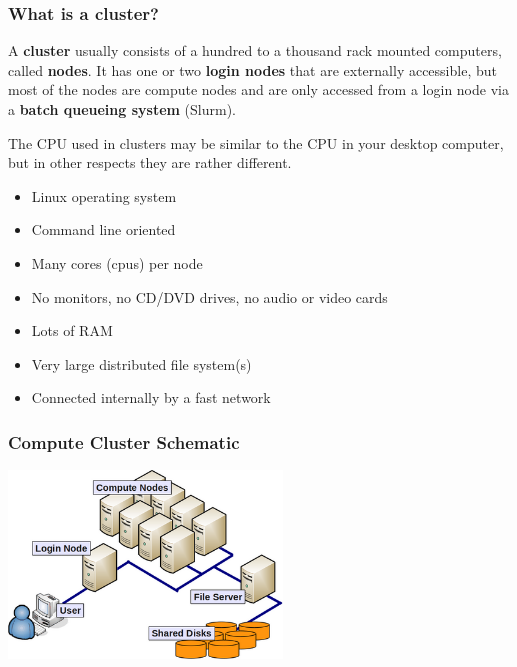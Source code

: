 \documentclass[10pt]{beamer}
\begin{document}
\begin{frame}
\frametitle{What is a cluster?}

A \textbf{cluster} usually consists of a hundred to a thousand rack mounted
computers, called \textbf{nodes}.  It has one or two \textbf{login nodes}
that are externally accessible, but most of the nodes are
compute nodes and are only accessed from a login node via a
\textbf{batch queueing system} (Slurm).

\vskip10pt
The CPU used in clusters may be similar to the CPU in your
desktop computer, but in other respects they are rather different.

\begin{itemize}
\item Linux operating system
\item Command line oriented 
\item Many cores (cpus) per node
\item No monitors, no CD/DVD drives, no audio or video cards
\item Lots of RAM
\item Very large distributed file system(s)
\item Connected internally by a fast network
\end{itemize}
\end{frame}

\begin{frame}[fragile]
\frametitle{Compute Cluster Schematic}
\begin{center} 
\includegraphics[height=5cm]{cluster.png} 
\end{center}
\end{frame}
\end{document}
